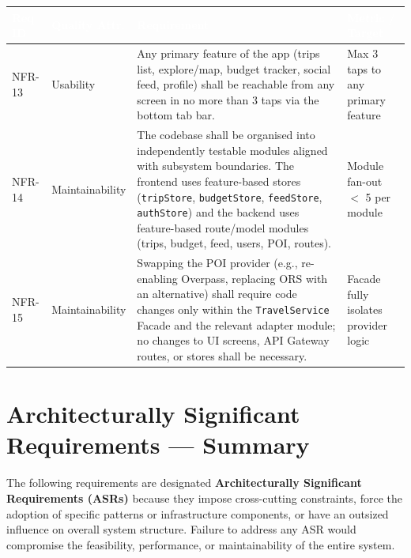 \documentclass[12pt, a4paper]{article}
\newcommand{\reqid}[1]{\textsc{\small #1}}
\newcommand{\thcell}[1]{\textcolor{white}{\textbf{\small #1}}}
\begin{document}
\vspace{0.4em}
\begin{longtable}{C{1.5cm} C{2.4cm} L{7.0cm} C{2.7cm}}
\toprule
{}
\thcell{Req ID} & \thcell{Quality Attr.} & \thcell{Requirement} & \thcell{Metric / Target} \\
\midrule
\endhead
\bottomrule
\endfoot

\reqid{NFR-13} & Usability &
Any primary feature of the app (trips list, explore/map, budget tracker, social feed, profile) shall be reachable from any screen in no more than 3 taps via the bottom tab bar. &
Max 3 taps to any primary feature \\

\reqid{NFR-14} & Maintainability &
The codebase shall be organised into independently testable modules aligned with subsystem boundaries. The frontend uses feature-based stores (\texttt{tripStore}, \texttt{budgetStore}, \texttt{feedStore}, \texttt{authStore}) and the backend uses feature-based route/model modules (trips, budget, feed, users, POI, routes). &
Module fan-out $<$ 5 per module \\

\reqid{NFR-15} & Maintainability &
Swapping the POI provider (e.g., re-enabling Overpass, replacing ORS with an alternative) shall require code changes only within the \texttt{TravelService} Facade and the relevant adapter module; no changes to UI screens, API Gateway routes, or stores shall be necessary. &
Facade fully isolates provider logic \\

\end{longtable}

\section{Architecturally Significant Requirements --- Summary}

The following requirements are designated \textbf{Architecturally Significant Requirements (ASRs)} because they impose cross-cutting constraints, force the adoption of specific patterns or infrastructure components, or have an outsized influence on overall system structure. Failure to address any ASR would compromise the feasibility, performance, or maintainability of the entire system.
\end{document}
